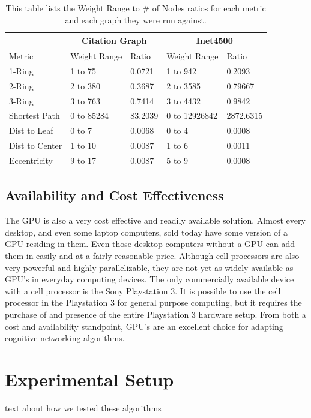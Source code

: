 \begin{table}
\begin{center}
\begin{tabular}{|l|l|l|l|l|}
\hline
 & \multicolumn{2}{|c|}{Citation Graph} & \multicolumn{2}{|c|}{Inet4500} \\
\hline
Metric & Weight Range & Ratio & Weight Range & Ratio \\
\hline
1-Ring& 1 to 75 & 0.0721 & 1 to 942 & 0.2093 \\
2-Ring & 2 to 380 & 0.3687 & 2 to 3585 & 0.79667 \\
3-Ring & 3 to 763 & 0.7414  & 3 to 4432 & 0.9842 \\
Shortest Path & 0 to 85284 & 83.2039 & 0 to 12926842 & 2872.6315 \\
Dist to Leaf & 0 to 7 & 0.0068 & 0 to 4 & 0.0008 \\
Dist to Center & 1 to 10 & 0.0087 & 1 to 6 & 0.0011 \\
Eccentricity & 9 to 17 & 0.0087 & 5 to 9 & 0.0008 \\
\hline
\end{tabular}
\caption{This table lists the Weight Range to \# of Nodes ratios for each metric and each graph they were run against.}
\label{tbl:matlab_vs_gpu_fft}
\end{center}
\end{table}

\subsection{Availability and Cost Effectiveness}
The GPU is also a very cost effective and readily available solution.  Almost every desktop, and even some laptop computers, sold today have some version of a GPU residing in them.  Even those desktop computers without a GPU can add them in easily and at a fairly reasonable price.  Although cell processors are also very powerful and highly parallelizable, they are not yet as widely available as GPU's in everyday computing devices.  The only commercially available device with a cell processor is the Sony Playstation 3.  It is possible to use the cell processor in the Playstation 3 for general purpose computing, but it requires the purchase of and presence of the entire Playstation 3 hardware setup.  From both a cost and availability standpoint, GPU's are an excellent choice for adapting cognitive networking algorithms.


\section{Experimental Setup}
text about how we tested these algorithms

